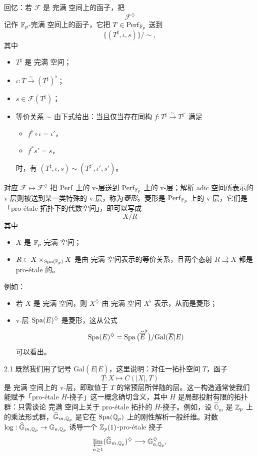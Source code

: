回忆：若 $\mathcal F$ 是 完满 空间上的函子，把
\[
\mathcal F^{\diamondsuit}
\]
记作 $\mathbb{F}_p$-完满 空间上的函子，它把 $T\in\operatorname{Perf}_{\mathbb{F}_p}$ 送到
\[
\{(T^\sharp,\iota,s)\}/\sim,
\]
其中
\begin{itemize}[leftmargin=1.6em,itemsep=0.2em]
\item $T^\sharp$ 是 完满 空间；
\item $\iota:T\xrightarrow{\ \sim\ }(T^\sharp)^\flat$；
\item $s\in\mathcal F(T^\sharp)$；
\item 等价关系 $\sim$ 由下式给出：当且仅当存在同构 $f:T^\sharp\xrightarrow{\ \sim\ }T^{\sharp\prime}$ 满足
\begin{itemize}[leftmargin=1.2em,itemsep=0.1em]
\item $f^\flat\circ\iota=\iota'$，
\item $f^*s'=s$，
\end{itemize}
时，有 $(T^\sharp,\iota,s)\sim(T^{\sharp\prime},\iota',s')$。
\end{itemize}

对应 $\mathcal F\mapsto\mathcal F^{\diamondsuit}$ 把 $\operatorname{Perf}$ 上的 v-层送到 $\operatorname{Perf}_{\mathbb{F}_p}$ 上的 v-层；解析 adic 空间所表示的 v-层则被送到某一类特殊的 v-层，称为\emph{菱形}。菱形是 $\operatorname{Perf}_{\mathbb{F}_p}$ 上的 v-层，它们是「pro-étale 拓扑下的代数空间」，即可以写成
\[
X/R
\]
其中
\begin{itemize}[leftmargin=1.6em,itemsep=0.2em]
\item $X$ 是 $\mathbb{F}_p$-完满 空间；
\item $R\subset X\times_{\operatorname{Spa}(\mathbb{F}_p)}X$ 是由 完满 空间表示的等价关系，且两个态射 $R\rightrightarrows X$ 都是 pro-étale 的。
\end{itemize}
例如：
\begin{itemize}[leftmargin=1.6em,itemsep=0.2em]
\item 若 $X$ 是 完满 空间，则 $X^{\diamondsuit}$ 由 完满 空间 $X^\flat$ 表示，从而是菱形；
\item v-层 $\operatorname{Spa}(E)^{\diamondsuit}$ 是菱形，这从公式
\[
\operatorname{Spa}(E)^{\diamondsuit}=\operatorname{Spa}\big(\widehat{\overline E}^{\flat}\big)/\mathrm{Gal}(\overline E|E)
\]
可以看出。
\end{itemize}

\begin{rem}{2.1}
既然我们用了记号 $\mathrm{Gal}(\overline E|E)$，这里说明：对任一拓扑空间 $T$，函子
\[
\underline T:X\longmapsto C(|X|,T)
\]
是 完满 空间上的 v-层，即取值于 $T$ 的常预层所伴随的层。这一构造通常使我们能赋予「pro-étale $H$-挠子」这一概念确切含义，其中 $H$ 是局部投射有限的拓扑群：只需谈论 完满 空间上关于 pro-étale 拓扑的 $H$-挠子。例如，设 $\widehat{\mathbb G}_m$ 是 $\mathbb{Z}_p$ 上的乘法形式群，$\widehat{\mathbb G}_{m,\mathbb{Q}_p}$ 是它在 $\operatorname{Spa}(\mathbb{Q}_p)$ 上的刚性解析一般纤维。对数 $\log:\widehat{\mathbb G}_{m,\mathbb{Q}_p}\to\mathbb G_{a,\mathbb{Q}_p}$ 诱导一个 $\mathbb{Z}_p(1)$-pro-étale 挠子
\[
\varprojlim_{n\ge1}(\widehat{\mathbb G}_{m,\mathbb{Q}_p})^{\diamondsuit}\longrightarrow\mathbb G_{a,\mathbb{Q}_p}^{\diamondsuit},
\]
\label{rem:a3-2-1}
\end{rem}

